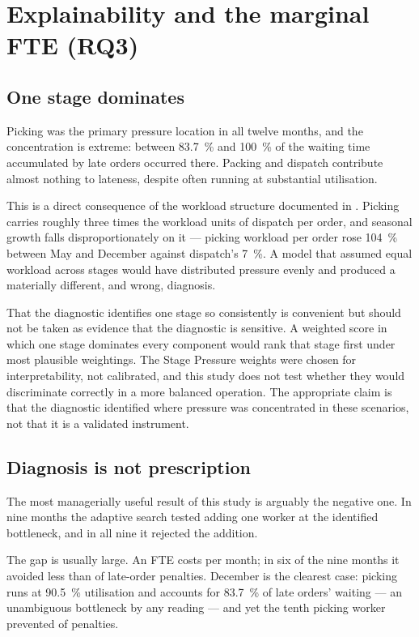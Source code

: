 \section{Explainability and the marginal FTE (RQ3)}
\label{sec:disc-bottleneck}

\subsection{One stage dominates}

Picking was the primary pressure location in all twelve months, and the concentration is
extreme: between \SI{83.7}{\percent} and \SI{100}{\percent} of the waiting time accumulated by
late orders occurred there. Packing and dispatch contribute almost nothing to lateness, despite
often running at substantial utilisation.

This is a direct consequence of the workload structure documented in
. Picking carries roughly three times the workload units of
dispatch per order, and seasonal growth falls disproportionately on it --- picking workload per
order rose \SI{104}{\percent} between May and December against dispatch's \SI{7}{\percent}. A
model that assumed equal workload across stages would have distributed pressure evenly and
produced a materially different, and wrong, diagnosis.

That the diagnostic identifies one stage so consistently is convenient but should not be taken
as evidence that the diagnostic is sensitive. A weighted score in which one stage dominates
every component would rank that stage first under most plausible weightings. The Stage Pressure
weights were chosen for interpretability, not calibrated, and this study does not test whether
they would discriminate correctly in a more balanced operation. The appropriate claim is that
the diagnostic identified where pressure was concentrated in these scenarios, not that it is a
validated instrument.

\subsection{Diagnosis is not prescription}

The most managerially useful result of this study is arguably the negative one. In nine months
the adaptive search tested adding one worker at the identified bottleneck, and in all nine it
rejected the addition.

The gap is usually large. An FTE costs  per month; in six of the nine months it
avoided less than  of late-order penalties. December is the clearest case: picking runs
at \SI{90.5}{\percent} utilisation and accounts for \SI{83.7}{\percent} of late orders' waiting
--- an unambiguous bottleneck by any reading --- and yet the tenth picking worker prevented
 of penalties.

